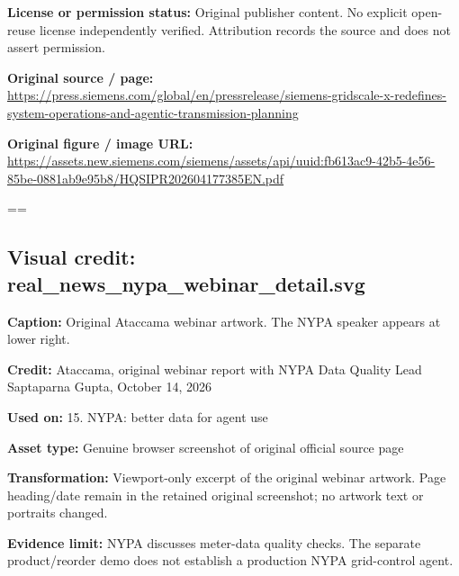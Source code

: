 \documentclass[10pt,letterpaper]{article}
\begin{document}
\textbf{License or permission status:} Original publisher content. No explicit open-reuse license independently verified. Attribution records the source and does not assert permission.\par
\textbf{Original source / page:} \href{https://press.siemens.com/global/en/pressrelease/siemens-gridscale-x-redefines-system-operations-and-agentic-transmission-planning}{\small\ttfamily https:/\allowbreak{}/\allowbreak{}press.\allowbreak{}siemens.\allowbreak{}com/\allowbreak{}global/\allowbreak{}en/\allowbreak{}pressrelease/\allowbreak{}siemens-\allowbreak{}gridscale-\allowbreak{}x-\allowbreak{}redefines-\allowbreak{}system-\allowbreak{}operations-\allowbreak{}and-\allowbreak{}agentic-\allowbreak{}transmission-\allowbreak{}planning}\par
\textbf{Original figure / image URL:} \href{https://assets.new.siemens.com/siemens/assets/api/uuid:fb613ac9-42b5-4e56-85be-0881ab9e95b8/HQSIPR202604177385EN.pdf}{\small\ttfamily https:/\allowbreak{}/\allowbreak{}assets.\allowbreak{}new.\allowbreak{}siemens.\allowbreak{}com/\allowbreak{}siemens/\allowbreak{}assets/\allowbreak{}api/\allowbreak{}uuid:fb613ac9-\allowbreak{}42b5-\allowbreak{}4e56-\allowbreak{}85be-\allowbreak{}0881ab9e95b8/\allowbreak{}HQSIPR202604177385EN.\allowbreak{}pdf}\par
\egroup\par\noindent\box\readingEntry\par\medskip
\setbox\readingEntry=\vbox\bgroup\hsize=\linewidth\subsection*{Visual credit: real\_news\_nypa\_webinar\_detail.svg}
\textbf{Caption:} Original Ataccama webinar artwork. The NYPA speaker appears at lower right.\par
\textbf{Credit:} Ataccama, original webinar report with NYPA Data Quality Lead Saptaparna Gupta, October 14, 2026\par
\textbf{Used on:} 15. NYPA: better data for agent use\par
\textbf{Asset type:} Genuine browser screenshot of original official source page\par
\textbf{Transformation:} Viewport-only excerpt of the original webinar artwork. Page heading/date remain in the retained original screenshot; no artwork text or portraits changed.\par
\textbf{Evidence limit:} NYPA discusses meter-data quality checks. The separate product/reorder demo does not establish a production NYPA grid-control agent.\par
\end{document}
